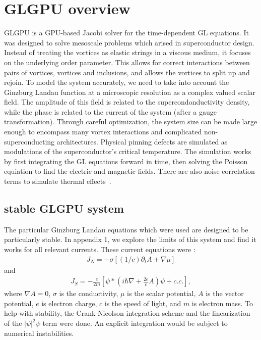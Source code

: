 \section{GLGPU overview}
GLGPU is a GPU-based Jacobi solver for the time-dependent GL equations. It was designed to solve mesoscale problems which arised in superconductor design. Instead of treating the vortices as elastic strings in a viscous medium, it focuses on the underlying order parameter. This allows for correct interactions between pairs of vortices, vortices and inclusions, and allows the vortices to split up and rejoin. To model the system accurately, we need to take into account the Ginzburg Landau function at a microscopic resolution as a complex valued scalar field. The amplitude of this field is related to the supercondonductivity density, while the phase is related to the current of the system (after a gauge transformation). Through careful optimization, the system size can be made large enough to encompass many vortex interactions and complicated non-superconducting architectures. Physical pinning defects are simulated as modulations of the superconductor's critical temperature. The simulation works by first integrating the GL equations forward in time, then solving the Poisson equiation to find the electric and magnetic fields. There are also noise correlation terms to simulate thermal effects~\cite{Sadovskyy14}.

\subsection{stable GLGPU system}
The particular Ginzburg Landau equations which were used are designed to be particularly stable. In appendix 1, we explore the limits of this system and find it works for all relevant currents. These current equations were :
\begin{eqnarray}
J_N = -\sigma [(1/c) \partial_t A + \nabla \mu ]
\label{currentEq1}
\end{eqnarray}
and
\begin{eqnarray}
J_S = -\frac{e}{2m} [\psi*(i\hbar \nabla + \frac{2e}{c} A) \psi + c.c.],
\label{currentEq2}
\end{eqnarray}
where $\nabla A = 0$, $\sigma$ is the conductivity, $\mu$ is the scalar potential, $A$ is the vector potential, $e$ is electron charge, $c$ is the speed of light, and $m$ is electron mass. To help with stability, the Crank-Nicolson integration scheme and the linearization of the $|\psi|^2\psi$ term were done. An explicit integration would be subject to numerical instabilities.

